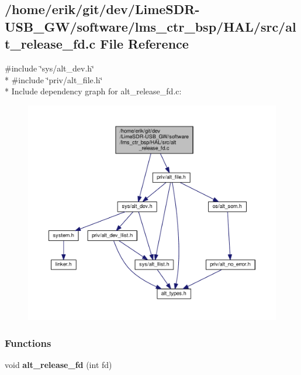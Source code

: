 \subsection{/home/erik/git/dev/\+Lime\+S\+D\+R-\/\+U\+S\+B\+\_\+\+G\+W/software/lms\+\_\+ctr\+\_\+bsp/\+H\+A\+L/src/alt\+\_\+release\+\_\+fd.c File Reference}
\label{alt__release__fd_8c}
{\ttfamily \#include \char`\"{}sys/alt\+\_\+dev.\+h\char`\"{}}\\*
{\ttfamily \#include \char`\"{}priv/alt\+\_\+file.\+h\char`\"{}}\\*
Include dependency graph for alt\+\_\+release\+\_\+fd.\+c\+:
\nopagebreak
\begin{figure}[H]
\begin{center}
\leavevmode
\includegraphics[width=350pt]{d3/dc5/alt__release__fd_8c__incl}
\end{center}
\end{figure}
\subsubsection*{Functions}
\begin{DoxyCompactItemize}
\item 
void {\bf alt\+\_\+release\+\_\+fd} (int fd)
\end{DoxyCompactItemize}


